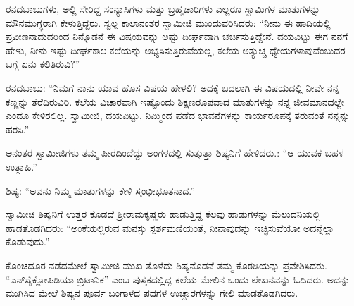 \vskip 1pt

 ರನದಬಾಬುಗಳು, ಅಲ್ಲಿ ಸೇರಿದ್ದ ಸಂನ್ಯಾಸಿಗಳು ಮತ್ತು ಬ್ರಹ್ಮಚಾರಿಗಳು ಎಲ್ಲರೂ ಸ್ವಾಮಿಗಳ ಮಾತುಗಳನ್ನು ಮೌನಮುಗ್ಧರಾಗಿ ಕೇಳುತ್ತಿದ್ದರು. ಸ್ವಲ್ಪ ಕಾಲಾನಂತರ ಸ್ವಾಮೀಜಿ ಮುಂದುವರಿಸಿದರು: “ನೀನು ಈ ಹಾದಿಯಲ್ಲಿ ಪ್ರವೀಣನಾದುದರಿಂದ ನಿನ್ನೊಡನೆ ಈ ವಿಷಯವನ್ನು ಅಷ್ಟು ದೀರ್ಘವಾಗಿ ಚರ್ಚಿಸುತ್ತಿದ್ದೇನೆ. ದಯವಿಟ್ಟು ಈಗ ನನಗೆ ಹೇಳು, ನೀನು ಇಷ್ಟು ದೀರ್ಘಕಾಲ ಕಲೆಯನ್ನು ಅಭ್ಯಸಿಸುತ್ತಿರುವೆಯಲ್ಲ, ಕಲೆಯ ಅತ್ಯುಚ್ಚ ಧ್ಯೇಯಗಳಾವುವೆಂಬುದರ ಬಗ್ಗೆ ಏನು ಕಲಿತಿರುವಿ?” 

 ರನದಬಾಬು: “ನಿಮಗೆ ನಾನು ಯಾವ ಹೊಸ ವಿಷಯ ಹೇಳಲಿ? ಅದಕ್ಕೆ ಬದಲಾಗಿ ಈ ವಿಷಯದಲ್ಲಿ ನೀವೇ ನನ್ನ ಕಣ್ಣನ್ನು ತೆರೆದಿರುವಿರಿ. ಕಲೆಯ ವಿಚಾರವಾಗಿ ಇಷ್ಟೊಂದು ಶಿಕ್ಷಣರೂಪವಾದ ಮಾತುಗಳನ್ನು ನನ್ನ ಜೀವಮಾನದಲ್ಲೇ ಎಂದೂ ಕೇಳಿರಲಿಲ್ಲ. ಸ್ವಾಮೀಜಿ, ದಯವಿಟ್ಟು, ನಿಮ್ಮಿಂದ ಪಡೆದ ಭಾವನೆಗಳನ್ನು ಕಾರ್ಯರೂಪಕ್ಕೆ ತರುವಂತೆ ನನ್ನನ್ನು ಹರಸಿ.” 

 ಅನಂತರ ಸ್ವಾಮೀಜಿಗಳು ತಮ್ಮ ಪೀಠದಿಂದೆದ್ದು ಅಂಗಳದಲ್ಲಿ ಸುತ್ತುತ್ತಾ ಶಿಷ್ಯನಿಗೆ ಹೇಳಿದರು.: “ಆ ಯುವಕ ಬಹಳ ಉತ್ಸಾಹಿ.” 

 ಶಿಷ್ಯ: “ಅವನು ನಿಮ್ಮ ಮಾತುಗಳನ್ನು ಕೇಳಿ ಸ್ತಂಭೀಭೂತನಾದ.” 

 ಸ್ವಾಮೀಜಿ ಶಿಷ್ಯನಿಗೆ ಉತ್ತರ ಕೊಡದೆ ಶ‍್ರೀರಾಮಕೃಷ್ಣರು ಹಾಡುತ್ತಿದ್ದ ಕೆಲವು ಹಾಡುಗಳನ್ನು ಮೆಲುದನಿಯಲ್ಲಿ ಹಾಡತೊಡಗಿದರು: “ಅಂಕೆಯಲ್ಲಿರುವ ಮನಸ್ಸು ಸ್ಪರ್ಶಮಣಿಯಂತೆ, ನೀನಾವುದನ್ನು ಇಚ್ಛಿಸುವೆಯೋ ಅದನ್ನೆಲ್ಲಾ ಕೊಡುವುದು.” 

 ಕೊಂಚದೂರ ನಡೆದಮೇಲೆ ಸ್ವಾಮೀಜಿ ಮುಖ ತೊಳೆದು ಶಿಷ್ಯನೊಡನೆ ತಮ್ಮ ಕೊಠಡಿಯನ್ನು ಪ್ರವೇಶಿಸಿದರು. “ಎನ್‍ಸೈಕ್ಲೋಪಿಡಿಯಾ ಬ್ರಿಟಾನಿಕ” ಎಂಬ ಪುಸ್ತಕದಲ್ಲಿದ್ದ ಕಲೆಯ ಮೇಲಿನ ಒಂದು ಲೇಖನವನ್ನು ಓದಿದರು. ಅದನ್ನು ಮುಗಿಸಿದ ಮೇಲೆ ಶಿಷ್ಯನ ಪೂರ್ವ ಬಂಗಾಳದ ಪದಗಳ ಉಚ್ಚಾರಗಳನ್ನು ಗೇಲಿ ಮಾಡತೊಡಗಿದರು. 

